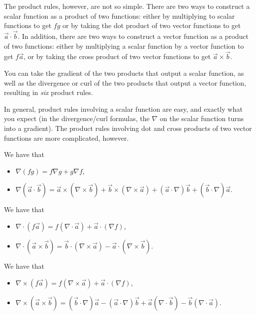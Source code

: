 The product rules, however, are not so simple.
There are two ways to construct a scalar function as a product of two functions:
either by multiplying to scalar functions to get $fg$
or by taking the dot product of two vector functions to get $\vec{a}\cdot\vec{b}$.
In addition, there are two ways to construct a vector function as a product of two functions:
either by multiplying a scalar function by a vector function to get $f\vec{a}$,
or by taking the cross product of two vector functions to get $\vec{a}\times\vec{b}$.

You can take the gradient of the two products that output a scalar function,
as well as the divergence or curl of the two products that output a vector function,
resulting in \textit{six} product rules.

In general, product rules involving a scalar function are easy, and exactly what you expect (in the divergence/curl formulas, the $\nabla$ on the scalar function turns into a gradient). The product rules involving dot and cross products of two vector functions are more complicated, however.

\begin{proposition}
    We have that
    \begin{itemize}
        \item $\nabla(fg)=f\nabla g+g\nabla f$,
        \item $\nabla(\vec{a}\cdot\vec{b}) = \vec{a}\times(\nabla\times \vec{b}) + \vec{b}\times(\nabla\times \vec{a})+(\vec{a}\cdot\nabla)\vec{b}+(\vec{b}\cdot\nabla)\vec{a}$.
    \end{itemize}
\end{proposition}

\begin{proposition}\label{divprodrul}
    We have that
    \begin{itemize}
        \item $\nabla\cdot(f\vec{a})=f(\nabla\cdot\vec{a})+\vec{a}\cdot(\nabla f)$,
        \item $\nabla\cdot(\vec{a}\times\vec{b})=\vec{b}\cdot(\nabla\times\vec{a})-\vec{a}\cdot(\nabla\times\vec{b})$.
    \end{itemize}
\end{proposition}

\begin{proposition}
    We have that
    \begin{itemize}
        \item $\nabla\times(f\vec{a})=f(\nabla\times\vec{a})+\vec{a}\cdot(\nabla f)$,
        \item $\nabla\times(\vec{a}\times\vec{b})=(\vec{b}\cdot \nabla)\vec{a}-(\vec{a}\cdot\nabla)\vec{b}+\vec{a}(\nabla\cdot\vec{b})-\vec{b}(\nabla\cdot\vec{a})$.
    \end{itemize}
\end{proposition}

